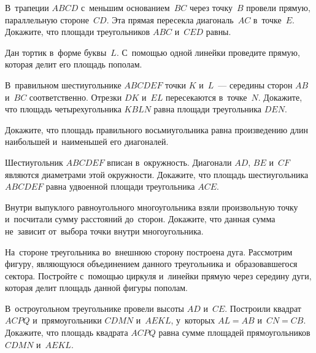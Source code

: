 


\begin{problems}

\item
В~трапеции $ABCD$ с~меньшим основанием~$BC$ через точку~$B$ провели прямую,
параллельную стороне~$CD$.
Эта прямая пересекла диагональ~$AC$ в~точке~$E$.
Докажите, что площади треугольников $ABC$ и~$CED$ равны.

\item
Дан тортик в~форме буквы~$L$.
С~помощью одной линейки проведите прямую, которая
делит его площадь пополам.

\item
В~правильном шестиугольнике $ABCDEF$ точки $K$ и~$L$~---
середины сторон $AB$ и~$BC$ соответственно.
Отрезки $DK$ и~$EL$ пересекаются в~точке~$N$.
Докажите, что площадь четырехугольника $KBLN$ равна площади треугольника $DEN$.

\item
Докажите, что площадь правильного восьмиугольника равна произведению длин
наибольшей и~наименьшей его диагоналей.

\item
Шестиугольник $ABCDEF$ вписан в~окружность.
Диагонали $AD$, $BE$ и~$CF$ являются диаметрами этой окружности.
Докажите, что площадь шестиугольника $ABCDEF$ равна удвоенной площади
треугольника $ACE$.

\item
Внутри выпуклого равноугольного многоугольника взяли произвольную точку
и~посчитали сумму расстояний до~сторон.
Докажите, что данная сумма не~зависит от~выбора точки внутри многоугольника.

\item
На~стороне треугольника во~внешнюю сторону построена дуга.
Рассмотрим фигуру, являющуюся объединением данного треугольника
и~образовавшегося сектора.
Постройте с~помощью циркуля и~линейки прямую через середину дуги, которая делит
площадь данной фигуры пополам.

\item
В~остроугольном треугольнике провели высоты $AD$ и~$CE$.
Построили квадрат $ACPQ$ и~прямоугольники $CDMN$ и~$AEKL$, у~которых $AL = AB$
и~$CN = CB$.
Докажите, что площадь квадрата $ACPQ$ равна сумме площадей
прямоугольников $CDMN$ и~$AEKL$.


\end{problems}

